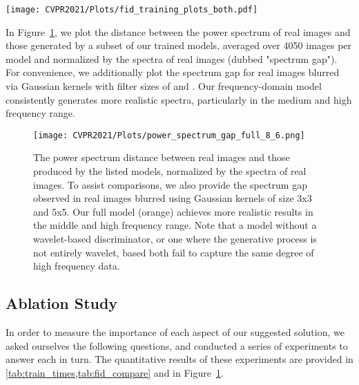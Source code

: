 \documentclass[final]{CVPR2021/cvpr}
\begin{document}
\begin{figure*}[t]
\begin{center}
\texttt{[image: CVPR2021/Plots/fid\_training\_plots\_both.pdf]}
\end{center}
   \caption{Model FID as a function of: (a) wall-clock time, (b) number of images viewed by the discriminator. Our model outperforms StyleGAN2 in both scenarios and displays increased stability during training.}
\label{fig:fid_compare_1024}
\end{figure*}

In Figure~\ref{fig:spectrum_256}, we plot the distance between the power spectrum of real images and those generated by a subset of our trained models, averaged over 4050 images per model and normalized by the spectra of real images (dubbed "spectrum gap"). For convenience, we additionally plot the spectrum gap for real images blurred via Gaussian kernels with filter sizes of  and . Our frequency-domain model consistently generates more realistic spectra, particularly in the medium and high frequency range.

\begin{figure}[t]
\begin{center}
\texttt{[image: CVPR2021/Plots/power\_spectrum\_gap\_full\_8\_6.png]}
\end{center}
   \caption{The power spectrum distance between real images and those produced by the listed models, normalized by the spectra of real images. To assist comparisons, we also provide the spectrum gap observed in real images blurred using Gaussian kernels of size 3x3 and 5x5. Our full model (orange) achieves more realistic results in the middle and high frequency range. Note that a model without a wavelet-based discriminator, or one where the generative process is not entirely wavelet, based both fail to capture the same degree of high frequency data. }
\label{fig:spectrum_256}
\end{figure}

\subsection{Ablation Study} 

In order to measure the importance of each aspect of our suggested solution, we asked ourselves the following questions, and conducted a series of experiments to answer each in turn. The quantitative results of these experiments are provided in \cref{tab:train_times,tab:fid_compare} and in Figure~\ref{fig:spectrum_256}.
\end{document}
